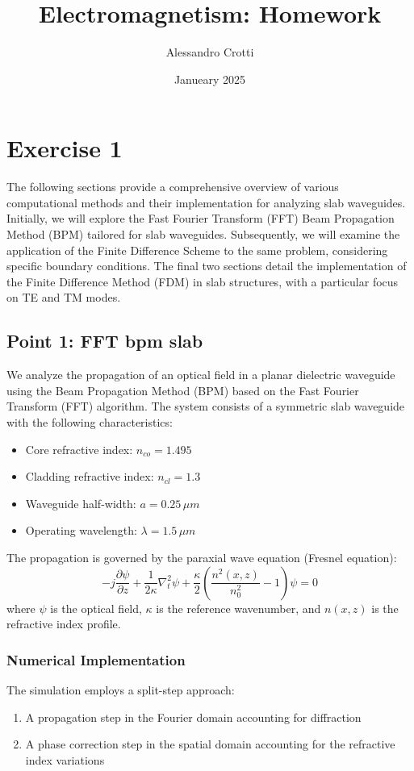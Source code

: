 \documentclass{article}
\title{Electromagnetism: Homework}
\author{Alessandro Crotti}
\date{Janueary 2025}
\begin{document}
\maketitle

\section{Exercise 1}
The following sections provide a comprehensive overview of various computational methods and their implementation for analyzing slab waveguides. Initially, we will explore the Fast Fourier Transform (FFT) Beam Propagation Method (BPM) tailored for slab waveguides. Subsequently, we will examine the application of the Finite Difference Scheme to the same problem, considering specific boundary conditions. The final two sections detail the implementation of the Finite Difference Method (FDM) in slab structures, with a particular focus on TE and TM modes.

\subsection{Point 1: FFT bpm slab}
We analyze the propagation of an optical field in a planar dielectric waveguide using the Beam Propagation Method (BPM) based on the Fast Fourier Transform (FFT) algorithm. The system consists of a symmetric slab waveguide with the following characteristics:
\begin{itemize}
    \item Core refractive index: $n_{co} = 1.495$
    \item Cladding refractive index: $n_{cl} = 1.3$
    \item Waveguide half-width: $a = 0.25\,\mu m$
    \item Operating wavelength: $\lambda = 1.5\,\mu m$
\end{itemize}
The propagation is governed by the paraxial wave equation (Fresnel equation):
\begin{equation}
    -j\frac{\partial\psi}{\partial z} + \frac{1}{2\kappa}\nabla_t^2\psi + \frac{\kappa}{2}\left(\frac{n^2(x,z)}{n_0^2} - 1\right)\psi = 0
\end{equation}
where $\psi$ is the optical field, $\kappa$ is the reference wavenumber, and $n(x,z)$ is the refractive index profile.

\subsubsection{Numerical Implementation}
The simulation employs a split-step approach:
\begin{enumerate}
    \item A propagation step in the Fourier domain accounting for diffraction
    \item A phase correction step in the spatial domain accounting for the refractive index variations
\end{enumerate}
\end{document}

